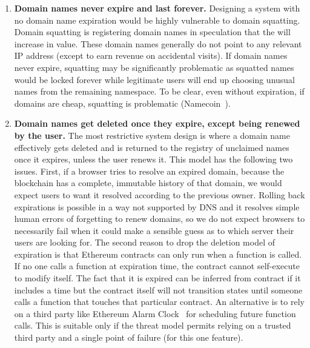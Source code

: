 \begin{enumerate}

\item \textbf{Domain names never expire and last forever.} Designing a system with no domain name expiration would be highly vulnerable to domain squatting. Domain squatting is registering domain names in speculation that the will increase in value. These domain names generally do not point to any relevant IP address (except to earn revenue on accidental visits). If domain names never expire, squatting may be significantly problematic as squatted names would be locked forever while legitimate users will end up choosing unusual names from the remaining namespace. To be clear, even without expiration, if domains are cheap, squatting is problematic (\eg Namecoin~\cite{Kalodner2015}). 

\item \textbf{Domain names get deleted once they expire, except being renewed by the user.} The most restrictive system design is where a domain name effectively gets deleted and is returned to the registry of unclaimed names once it expires, unless the user renews it. This model has the following two issues. First, if a browser tries to resolve an expired domain, because the blockchain has a complete, immutable history of that domain, we would expect users to want it resolved according to the previous owner. Rolling back expirations is possible in a way not supported by DNS and it resolves simple human errors of forgetting to renew domains, so we do not expect browsers to necessarily fail when it could make a sensible guess as to which server their users are looking for. The second reason to drop the deletion model of expiration is that Ethereum contracts can only run when a function is called. If no one calls a function at expiration time, the contract cannot self-execute to modify itself. The fact that it is expired can be inferred from contract if it includes a time but the contract itself will not transition states until someone calls a function that touches that particular contract. An alternative is to rely on a third party like Ethereum Alarm Clock~\cite {Home41:online} for scheduling future function calls. This is suitable only if the threat model permits relying on a trusted third party and a single point of failure (for this one feature). 


\end{enumerate}
